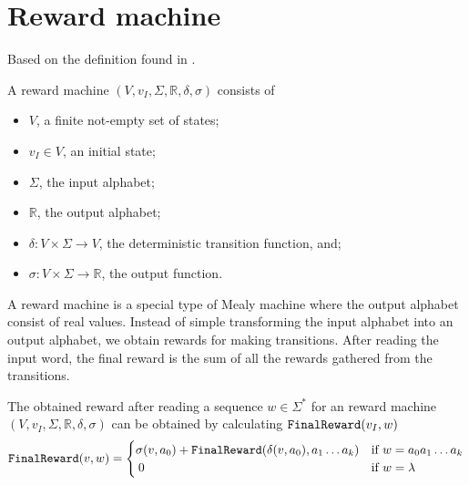 \section{Reward machine}
Based on the definition found in \cite{p:jirp}.
\begin{definition}
	A reward machine $(V,v_I,\Sigma,\mathbb{R},\delta,\sigma)$ consists of
	\begin{itemize}
		\item $V$, a finite not-empty set of states;
		\item $v_I\in V$, an initial state;
		\item $\Sigma$, the input alphabet;
		\item $\mathbb{R}$, the output alphabet;
		\item $\delta: V\times\Sigma\to V$, the deterministic transition function, and;
		\item $\sigma: V\times\Sigma\to \mathbb{R}$, the output function.
		\end{itemize}
\end{definition}
A reward machine is a special type of Mealy machine where the output alphabet consist of real values. Instead of simple transforming the input alphabet into an output alphabet, we obtain rewards for making transitions. After reading the input word, the final reward is the sum of all the rewards gathered from the transitions.

The obtained reward after reading a sequence $w\in\Sigma^*$ for an reward machine $(V,v_I,\Sigma,\mathbb{R},\delta,\sigma)$ can be obtained by calculating $\texttt{FinalReward}(v_I,w)$
\begin{equation*} 
	\texttt{FinalReward}(v, w) = 
\begin{cases}
	\sigma(v,a_0) + \texttt{FinalReward}(\delta(v,a_0),a_1\dots a_k) & \text{if }w=a_0 a_1 \dots a_k \\
	\: 0 & \text{if } w=\lambda
\end{cases}
\end{equation*}
